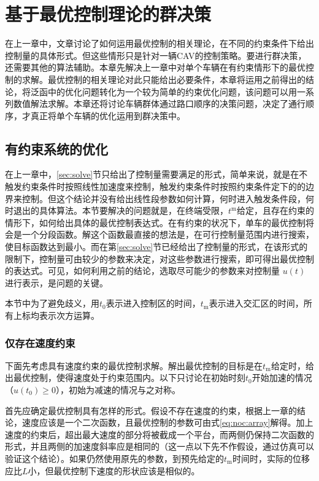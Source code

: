 \chapter{基于最优控制理论的群决策}
\label{cha:num}
在上一章中，文章讨论了如何运用最优控制的相关理论，在不同的约束条件下给出控制量的具体形式。但这些情形只是针对一辆CAV的控制策略。要进行群决策，还需要其他的算法辅助。本章先解决上一章中对单个车辆在有约束情形下的最优控制的求解。最优控制的相关理论对此只能给出必要条件，本章将运用之前得出的结论，将泛函中的优化问题转化为一个较为简单的约束优化问题，该问题可以用一系列数值解法求解。本章还将讨论车辆群体通过路口顺序的决策问题，决定了通行顺序，才真正将单个车辆的优化运用到群决策中。

\section{有约束系统的优化}
\label{sec:cc}
在上一章中，\ref{sec:solve}节只给出了控制量需要满足的形式，简单来说，就是在不触发约束条件时按照线性加速度来控制，触发约束条件时按照约束条件定下的的边界来控制。但这个结论并没有给出线性段参数如何计算，何时进入触发条件段，何时退出的具体算法。本节要解决的问题就是，在终端受限，$t^\mathrm{m}$给定，且存在约束的情形下，如何给出具体的最优控制表达式。在有约束的状况下，单车的最优控制将会是一个分段函数。解这个函数最直接的想法是，在可行控制量范围内进行搜索，使目标函数达到最小。而在第\ref{sec:solve}节已经给出了控制量的形式，在该形式的限制下，控制量可由较少的参数来决定，对这些参数进行搜索，即可得出最优控制的表达式。可见，如何利用之前的结论，选取尽可能少的参数来对控制量 $u(t)$进行表示，是问题的关键。

本节中为了避免歧义，用$t_0$表示进入控制区的时间，$t_\mathrm{m}$表示进入交汇区的时间，所有上标均表示次方运算。

\subsection{仅存在速度约束}
下面先考虑具有速度约束的最优控制求解。解出最优控制的目标是在$t_\mathrm{m}$给定时，给出最优控制，使得速度处于约束范围内。以下只讨论在初始时刻$t_0$开始加速的情况（$u(t_0)\geq 0$），初始为减速的情况与之对称。

首先应确定最优控制具有怎样的形式。假设不存在速度的约束，根据上一章的结论，速度应该是一个二次函数，且最优控制的参数可由式\eqref{eq:noc:array}解得。加上速度的约束后，超出最大速度的部分将被截成一个平台，而两侧仍保持二次函数的形式，并且两侧的加速度斜率应是相同的（这一点以下先不作假设，通过仿真可以验证这个结论）。如果仍然使用原先的参数，到预先给定的$t_\mathrm{m}$时间时，实际的位移应比$L$小，但最优控制下速度的形状应该是相似的。

